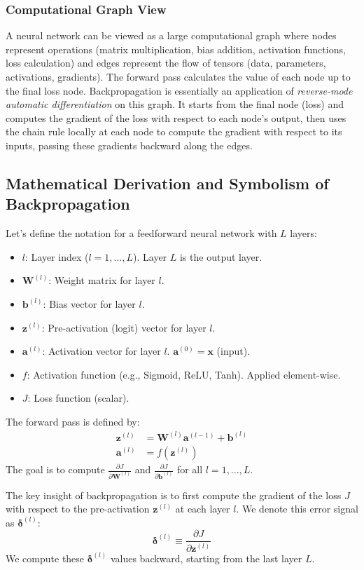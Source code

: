 \documentclass{article}
\newcommand{\bW}{\bm{W}}
\newcommand{\bb}{\bm{b}}
\newcommand{\bz}{\bm{z}}
\newcommand{\ba}{\bm{a}}
\newcommand{\bx}{\bm{x}}
\newcommand{\bdelta}{\bm{\delta}}
\begin{document}
\subsubsection{Computational Graph View}
A neural network can be viewed as a large computational graph where nodes represent operations (matrix multiplication, bias addition, activation functions, loss calculation) and edges represent the flow of tensors (data, parameters, activations, gradients). The forward pass calculates the value of each node up to the final loss node. Backpropagation is essentially an application of \emph{reverse-mode automatic differentiation} on this graph. It starts from the final node (loss) and computes the gradient of the loss with respect to each node's output, then uses the chain rule locally at each node to compute the gradient with respect to its inputs, passing these gradients backward along the edges.

\subsection{Mathematical Derivation and Symbolism of Backpropagation}

Let's define the notation for a feedforward neural network with $L$ layers:
\begin{itemize}
    \item $l$: Layer index ($l=1, ..., L$). Layer $L$ is the output layer.
    \item $\bW^{(l)}$: Weight matrix for layer $l$.
    \item $\bb^{(l)}$: Bias vector for layer $l$.
    \item $\bz^{(l)}$: Pre-activation (logit) vector for layer $l$.
    \item $\ba^{(l)}$: Activation vector for layer $l$. $\ba^{(0)} = \bx$ (input).
    \item $f$: Activation function (e.g., Sigmoid, ReLU, Tanh). Applied element-wise.
    \item $J$: Loss function (scalar).
\end{itemize}
The forward pass is defined by:
\begin{align}
    \bz^{(l)} &= \bW^{(l)} \ba^{(l-1)} + \bb^{(l)} \\
    \ba^{(l)} &= f(\bz^{(l)})
\end{align}
The goal is to compute $\frac{\partial J}{\partial \bW^{(l)}}$ and $\frac{\partial J}{\partial \bb^{(l)}}$ for all $l=1, ..., L$.

The key insight of backpropagation is to first compute the gradient of the loss $J$ with respect to the pre-activation $\bz^{(l)}$ at each layer $l$. We denote this error signal as $\bdelta^{(l)}$:
\begin{equation}
    \bdelta^{(l)} \equiv \frac{\partial J}{\partial \bz^{(l)}}
\end{equation}
We compute these $\bdelta^{(l)}$ values backward, starting from the last layer $L$.
\end{document}
